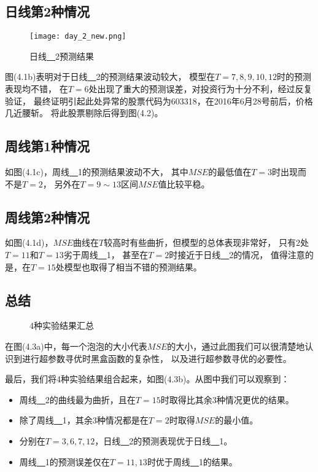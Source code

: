 \subsection{日线第2种情况}

\begin{figure}[htb]
    \centering
    \texttt{[image: day\_2\_new.png]}
    \caption{日线\underline{~~}2预测结果}
\end{figure}

图(4.1b)表明对于日线\underline{~~}2的预测结果波动较大，
模型在$T=7,8,9,10,12$时的预测表现均不错，
在$T=6$处出现了重大的预测误差，对投资行为十分不利，经过反复验证，
最终证明引起此处异常的股票代码为603318，在2016年6月28号前后，价格几近腰斩。
将此股票剔除后得到图(4.2)。

\subsection{周线第1种情况}

如图(4.1c)，周线\underline{~~}1的预测结果波动不大，
其中$MSE$的最低值在$T=3$时出现而不是$T=2$，
另外在$T=9\sim13$区间$MSE$值比较平稳。

\subsection{周线第2种情况}

如图(4.1d)，$MSE$曲线在$T$较高时有些曲折，但模型的总体表现非常好，
只有2处$T=11$和$T=13$劣于周线\underline{~~}1，
甚至在$T=2$时接近于日线\underline{~~}2的情况，
值得注意的是，在$T=15$处模型也取得了相当不错的预测结果。

\subsection{总结}

\begin{figure}[ht]
    \centering
    \quad
    \caption{4种实验结果汇总}
\end{figure}

在图(4.3a)中，每一个泡泡的大小代表$MSE$的大小，通过此图我们可以很清楚地认识到进行超参数寻优时黑盒函数的复杂性，
以及进行超参数寻优的必要性。

最后，我们将4种实验结果组合起来，如图(4.3b)。从图中我们可以观察到：
\begin{itemize}
    \item 周线\underline{~~}2的曲线最为曲折，且在$T=15$时取得比其余3种情况更优的结果。
    \item 除了周线\underline{~~}1，其余3种情况都是在$T=2$时取得$MSE$的最小值。
    \item 分别在$T=3,6,7,12$，日线\underline{~~}2的预测表现优于日线\underline{~~}1。
    \item 周线\underline{~~}1的预测误差仅在$T=11,13$时优于周线\underline{~~}1的结果。
\end{itemize}

